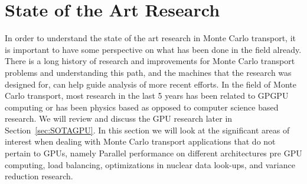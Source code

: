 \section{ \textbf{ State of the Art Research} }

In order to understand the state of the art research in Monte Carlo transport, it is important to have some perspective on what has been done in the field already.
%
There is a long history of research and improvements for Monte Carlo transport problems and understanding this path, and the machines that the research was designed for, can help guide analysis of more recent efforts.
%
In the field of Monte Carlo transport, most research in the last 5 years has been related to GPGPU computing or has been physics based as opposed to computer science based research.
%
We will review and discuss the GPU research later in Section~\ref{sec:SOTAGPU}.
%
In this section we will look at the significant areas of interest when dealing with Monte Carlo transport applications that do not pertain to GPUs, namely Parallel performance on different architectures pre GPU computing, load balancing, optimizations in nuclear data look-ups, and variance reduction research.
%
